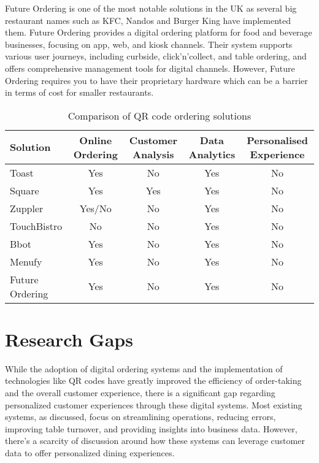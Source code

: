 Future Ordering \cite{14} is one of the most notable solutions in the UK as several big restaurant names such as KFC, Nandos and Burger King have implemented them. Future Ordering provides a digital ordering platform for food and beverage businesses, focusing on app, web, and kiosk channels. Their system supports various user journeys, including curbside, click’n’collect, and table ordering, and offers comprehensive management tools for digital channels. However, Future Ordering requires you to have their proprietary hardware which can be a barrier in terms of cost for smaller restaurants.
\begin{table}[H]
    \centering
    \begin{tabularx}{\textwidth}{|X|c|c|c|c|}
    \hline
    \textbf{Solution} & \textbf{Online Ordering} & \textbf{Customer Analysis} & \textbf{Data Analytics} & \textbf{Personalised Experience} \\
    \hline
    Toast \cite{8} & Yes & No & Yes & No \\
    \hline
    Square \cite{9} & Yes & Yes & Yes & No \\
    \hline
    Zuppler \cite{10} & Yes/No & No & Yes & No \\
    \hline
    TouchBistro \cite{11} & No & No & Yes & No \\
    \hline
    Bbot \cite{12} & Yes & No & Yes & No \\
    \hline
    Menufy \cite{13} & Yes & No & Yes & No \\
    \hline
    Future Ordering \cite{14} & Yes & No & Yes & No \\
    \hline
    \end{tabularx}
    \caption{Comparison of QR code ordering solutions}
    \label{tab:comparison}
\end{table}

\section{Research Gaps}

While the adoption of digital ordering systems and the implementation of technologies like QR codes have greatly improved the efficiency of order-taking and the overall customer experience, there is a significant gap regarding personalized customer experiences through these digital systems. Most existing systems, as discussed, focus on streamlining operations, reducing errors, improving table turnover, and providing insights into business data. However, there's a scarcity of discussion around how these systems can leverage customer data to offer personalized dining experiences. 

